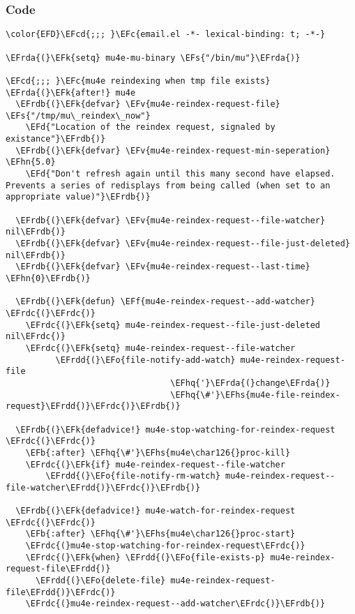 \documentclass[a4wide,10pt]{article}
\newcommand{\EFc}[1]{\textcolor{EFc}{#1}} %
\newcommand{\EFcd}[1]{\textcolor{EFcd}{#1}} %
\newcommand{\EFs}[1]{\textcolor{EFs}{#1}} %
\newcommand{\EFd}[1]{\textcolor{EFd}{#1}} %
\newcommand{\EFk}[1]{\textcolor{EFk}{#1}} %
\newcommand{\EFb}[1]{\textcolor{EFb}{#1}} %
\newcommand{\EFf}[1]{\textcolor{EFf}{#1}} %
\newcommand{\EFv}[1]{\textcolor{EFv}{#1}} %
\newcommand{\EFo}[1]{\textcolor{EFo}{#1}} %
\newcommand{\EFhn}[1]{\textcolor{EFhn}{\textbf{#1}}} %
\newcommand{\EFhq}[1]{\textcolor{EFhq}{#1}} %
\newcommand{\EFhs}[1]{\textcolor{EFhs}{#1}} %
\newcommand{\EFrda}[1]{\textcolor{EFrda}{#1}} %
\newcommand{\EFrdb}[1]{\textcolor{EFrdb}{#1}} %
\newcommand{\EFrdc}[1]{\textcolor{EFrdc}{#1}} %
\newcommand{\EFrdd}[1]{\textcolor{EFrdd}{#1}} %
\begin{document}
\subsubsection{Code}
\label{sec:org310e984}
\begin{Code}
\begin{Verbatim}
\color{EFD}\EFcd{;;; }\EFc{email.el -*- lexical-binding: t; -*-}

\EFrda{(}\EFk{setq} mu4e-mu-binary \EFs{"/bin/mu"}\EFrda{)}

\EFcd{;;; }\EFc{mu4e reindexing when tmp file exists}
\EFrda{(}\EFk{after!} mu4e
  \EFrdb{(}\EFk{defvar} \EFv{mu4e-reindex-request-file} \EFs{"/tmp/mu\_reindex\_now"}
    \EFd{"Location of the reindex request, signaled by existance"}\EFrdb{)}
  \EFrdb{(}\EFk{defvar} \EFv{mu4e-reindex-request-min-seperation} \EFhn{5.0}
    \EFd{"Don't refresh again until this many second have elapsed.
Prevents a series of redisplays from being called (when set to an appropriate value)"}\EFrdb{)}

  \EFrdb{(}\EFk{defvar} \EFv{mu4e-reindex-request--file-watcher} nil\EFrdb{)}
  \EFrdb{(}\EFk{defvar} \EFv{mu4e-reindex-request--file-just-deleted} nil\EFrdb{)}
  \EFrdb{(}\EFk{defvar} \EFv{mu4e-reindex-request--last-time} \EFhn{0}\EFrdb{)}

  \EFrdb{(}\EFk{defun} \EFf{mu4e-reindex-request--add-watcher} \EFrdc{(}\EFrdc{)}
    \EFrdc{(}\EFk{setq} mu4e-reindex-request--file-just-deleted nil\EFrdc{)}
    \EFrdc{(}\EFk{setq} mu4e-reindex-request--file-watcher
          \EFrdd{(}\EFo{file-notify-add-watch} mu4e-reindex-request-file
                                 \EFhq{'}\EFrda{(}change\EFrda{)}
                                 \EFhq{\#'}\EFhs{mu4e-file-reindex-request}\EFrdd{)}\EFrdc{)}\EFrdb{)}

  \EFrdb{(}\EFk{defadvice!} mu4e-stop-watching-for-reindex-request \EFrdc{(}\EFrdc{)}
    \EFb{:after} \EFhq{\#'}\EFhs{mu4e\char126{}proc-kill}
    \EFrdc{(}\EFk{if} mu4e-reindex-request--file-watcher
        \EFrdd{(}\EFo{file-notify-rm-watch} mu4e-reindex-request--file-watcher\EFrdd{)}\EFrdc{)}\EFrdb{)}

  \EFrdb{(}\EFk{defadvice!} mu4e-watch-for-reindex-request \EFrdc{(}\EFrdc{)}
    \EFb{:after} \EFhq{\#'}\EFhs{mu4e\char126{}proc-start}
    \EFrdc{(}mu4e-stop-watching-for-reindex-request\EFrdc{)}
    \EFrdc{(}\EFk{when} \EFrdd{(}\EFo{file-exists-p} mu4e-reindex-request-file\EFrdd{)}
      \EFrdd{(}\EFo{delete-file} mu4e-reindex-request-file\EFrdd{)}\EFrdc{)}
    \EFrdc{(}mu4e-reindex-request--add-watcher\EFrdc{)}\EFrdb{)}


\end{Verbatim}
\end{Code}
\end{document}
